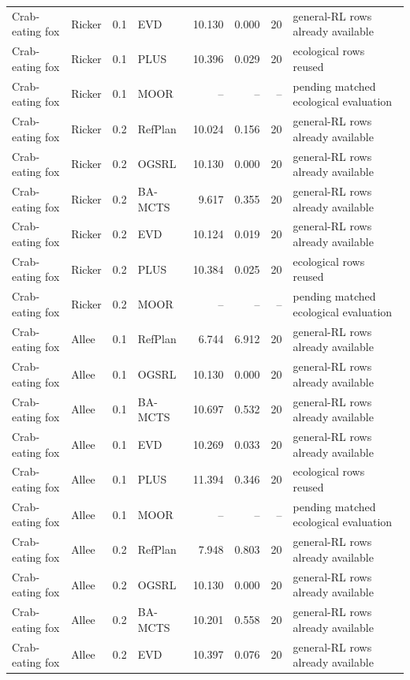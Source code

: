 \documentclass[10pt]{article}
\begin{document}
\begin{landscape}
\begin{center}
\begin{longtable}{@{}llclr rrp{5.2cm}@{}}
Crab-eating fox & Ricker & 0.1 & EVD & 10.130 & 0.000 & 20 & general-RL rows already available \\
Crab-eating fox & Ricker & 0.1 & PLUS & 10.396 & 0.029 & 20 & ecological rows reused \\
Crab-eating fox & Ricker & 0.1 & MOOR & -- & -- & -- & pending matched ecological evaluation \\
\addlinespace[1.5pt]
Crab-eating fox & Ricker & 0.2 & RefPlan & 10.024 & 0.156 & 20 & general-RL rows already available \\
Crab-eating fox & Ricker & 0.2 & OGSRL & 10.130 & 0.000 & 20 & general-RL rows already available \\
Crab-eating fox & Ricker & 0.2 & BA-MCTS & 9.617 & 0.355 & 20 & general-RL rows already available \\
Crab-eating fox & Ricker & 0.2 & EVD & 10.124 & 0.019 & 20 & general-RL rows already available \\
Crab-eating fox & Ricker & 0.2 & PLUS & 10.384 & 0.025 & 20 & ecological rows reused \\
Crab-eating fox & Ricker & 0.2 & MOOR & -- & -- & -- & pending matched ecological evaluation \\
\addlinespace[1.5pt]
Crab-eating fox & Allee & 0.1 & RefPlan & 6.744 & 6.912 & 20 & general-RL rows already available \\
Crab-eating fox & Allee & 0.1 & OGSRL & 10.130 & 0.000 & 20 & general-RL rows already available \\
Crab-eating fox & Allee & 0.1 & BA-MCTS & 10.697 & 0.532 & 20 & general-RL rows already available \\
Crab-eating fox & Allee & 0.1 & EVD & 10.269 & 0.033 & 20 & general-RL rows already available \\
Crab-eating fox & Allee & 0.1 & PLUS & 11.394 & 0.346 & 20 & ecological rows reused \\
Crab-eating fox & Allee & 0.1 & MOOR & -- & -- & -- & pending matched ecological evaluation \\
\addlinespace[1.5pt]
Crab-eating fox & Allee & 0.2 & RefPlan & 7.948 & 0.803 & 20 & general-RL rows already available \\
Crab-eating fox & Allee & 0.2 & OGSRL & 10.130 & 0.000 & 20 & general-RL rows already available \\
Crab-eating fox & Allee & 0.2 & BA-MCTS & 10.201 & 0.558 & 20 & general-RL rows already available \\
Crab-eating fox & Allee & 0.2 & EVD & 10.397 & 0.076 & 20 & general-RL rows already available \\

\end{longtable}
\end{center}
\end{landscape}
\end{document}
